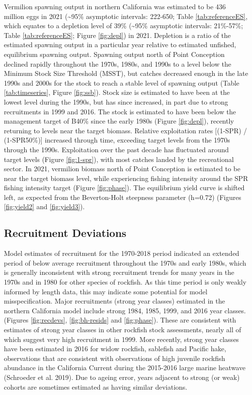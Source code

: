 \documentclass[
  english,
  a4paper,
]{article}
\begin{document}
Vermilion spawning output in northern California was estimated to be 436 million eggs in 2021 (\textasciitilde95\% asymptotic intervals: 222-650; Table \ref{tab:referenceES}, which equates to a depletion level of 39\% (\textasciitilde95\% asymptotic intervals: 21\%-57\%; Table \ref{tab:referenceES}; Figure \ref{fig:depl}) in 2021. Depletion is a ratio of the estimated spawning output in a particular year relative to estimated unfished, equilibrium spawning output. Spawning output north of Point Conception declined rapidly throughout the 1970s, 1980s, and 1990s to a level below the Minimum Stock Size Threshold (MSST), but catches decreased enough in the late 1990s and 2000s for the stock to reach a stable level of spawning output (Table \ref{tab:timeseries}, Figure \ref{fig:ssb}). Stock size is estimated to have been at the lowest level during the 1990s, but has since increased, in part due to strong recruitments in 1999 and 2016. The stock is estimated to have been below the management target of B40\% since the early 1980s (Figure \ref{fig:depl}), recently returning to levels near the target biomass. Relative exploitation rates {[}(1-SPR) / (1-SPR50\%){]} increased through time, exceeding target levels from the 1970s through the 1990s. Exploitation over the past decade has fluctuated around target levels (Figure \ref{fig:1-spr}), with most catches landed by the recreational sector. In 2021, vermilion biomass north of Point Conception is estimated to be near the target biomass level, while experiencing fishing intensity around the SPR fishing intensity target (Figure \ref{fig:phase}). The equilibrium yield curve is shifted left, as expected from the Beverton-Holt steepness parameter (h=0.72) (Figures \ref{fig:yield2} and \ref{fig:yield3}).

\hypertarget{recruitment-deviations}{%
\subsection{Recruitment Deviations}\label{recruitment-deviations}}

Model estimates of recruitment for the 1970-2018 period indicated an extended period of below average recruitment throughout the 1970s and early 1980s, which is generally inconsistent with strong recruitment trends for many years in the 1970s and in 1980 for other species of rockfish. As this time period is only weakly informed by length data, this may indicate some potential for model misspecification. Major recruitments (strong year classes) estimated in the northern California model include strong 1984, 1985, 1999, and 2016 year classes. (Figures \ref{fig:recdevs}, \ref{fig:bh-resids} and \ref{fig:phase}). These are consistent with estimates of strong year classes in other rockfish stock assessments, nearly all of which suggest very high recruitment in 1999. More recently, strong year classes have been estimated in 2016 for widow rockfish, sablefish and Pacific hake, observations that are consistent with observations of high juvenile rockfish abundance in the California Current during the 2015-2016 large marine heatwave (Schroeder et al. 2019). Due to ageing error, years adjacent to strong (or weak) cohorts are sometimes estimated as having similar deviations.
\end{document}
